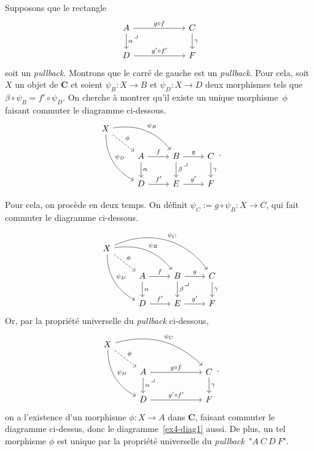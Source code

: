 \documentclass{../../td}
\newcommand\pullback{\arrow[very near start,description,phantom]{dr}{\lrcorner}}
\begin{document}
  Supposons que le rectangle \[
  \begin{tikzcd}
    A \arrow{rr}{g\circ f} \arrow{d}{\alpha}\pullback && C \arrow{d}{\gamma}\\
    D \arrow{rr}{g'\circ f'} &~& F
  \end{tikzcd}
  \] 
  soit un \textit{pullback}. Montrons que le carré de gauche est un \textit{pullback}.
  Pour cela, soit $X$ un objet de $\mathbf{C}$ et soient $\psi_B : X \to B$ et $\psi_D : X \to D$ deux morphismes tels que $\beta \circ \psi_B = f' \circ \psi_D$.
  On cherche à montrer qu'il existe un unique morphisme~$\phi$ faisant commuter le diagramme ci-dessous.
  \[
    \begin{tikzcd}
      X \arrow[dashed]{dr}{\phi} \arrow[bend left]{drr}{\psi_B} \arrow[bend right]{ddr}{\psi_D}\\
      &A \arrow{r}{f}\arrow{d}{\alpha} & B\arrow{r}{g}\arrow{d}{\beta}\pullback & C\arrow{d}{\gamma}\\
      &D \arrow{r}{f'} & E\arrow{r}{g'} & F
    \end{tikzcd}
  .\]

  Pour cela, on procède en deux temps.
  On définit $\psi_C := g \circ \psi_B : X \to C$, qui fait commuter le diagramme ci-dessous.
  \begin{equation}\label{ex4-diag1}
    \begin{tikzcd}
      X \arrow[dashed]{dr}{\phi} \arrow[bend left]{drr}{\psi_B} \arrow[bend right]{ddr}{\psi_D} \arrow[bend left=40]{drrr}{\psi_C}\\
      &A \arrow{r}{f}\arrow{d}{\alpha} & B\arrow{r}{g}\arrow{d}{\beta}\pullback & C\arrow{d}{\gamma}\\
      &D \arrow{r}{f'} & E\arrow{r}{g'} & F
    \end{tikzcd}
  \end{equation}
  Or, par la propriété universelle du \textit{pullback} ci-dessous, \[
    \begin{tikzcd}
      X \arrow[dashed]{dr}{\phi} \arrow[bend left]{drrr}{\psi_C} \arrow[bend right]{ddr}{\psi_D}\\
      &A \arrow{rr}{g\circ f} \arrow{d}{\alpha}\pullback && C \arrow{d}{\gamma}\\
      &D \arrow{rr}{g'\circ f'} &~& F
    \end{tikzcd}
  .\]
  on a l'existence d'un morphisme $\phi : X \to A$ dans $\mathbf{C}$, faisant commuter le diagramme ci-dessus, donc le diagramme~\ref{ex4-diag1} aussi.
  De plus, un tel morphisme $\phi$ est unique par la propriété universelle du \textit{pullback}~"$A\:C\:D\:F$".
\end{document}
